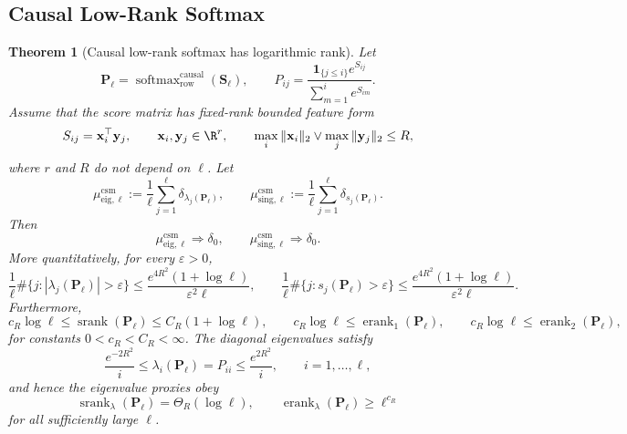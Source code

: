 \documentclass{article}
\newcommand{\srank}{\operatorname{srank}}
\newcommand{\erank}{\operatorname{erank}}
\newcommand{\weak}{\Rightarrow}
\newcommand{\one}{\mathbf{1}}
\newcommand{\bP}{\mathbf{P}}
\newcommand{\bS}{\mathbf{S}}
\newtheorem{theorem}{Theorem}
\theoremstyle{definition}
\theoremstyle{remark}
\begin{document}
\subsection{Causal Low-Rank Softmax}

\begin{theorem}[Causal low-rank softmax has logarithmic rank]
\label{thm:low-rank-causal-softmax-collapse}
Let
\[
    \bP_\ell
    =
    \operatorname{softmax}_{\mathrm{row}}^{\mathrm{causal}}(\bS_\ell),
    \qquad
    P_{ij}
    =
    \frac{\one_{\{j\leq i\}}e^{S_{ij}}}{\sum_{m=1}^{i}e^{S_{im}}}.
\]
Assume that the score matrix has fixed-rank bounded feature form
\begin{equation}
    S_{ij}=\mathbf x_i^\top\mathbf y_j,\qquad
    \mathbf x_i,\mathbf y_j\in\R^r,\qquad
    \max_i\|\mathbf x_i\|_2\vee\max_j\|\mathbf y_j\|_2\leq R,
    \label{eq:bounded-low-rank-causal-softmax-scores}
\end{equation}
where $r$ and $R$ do not depend on $\ell$.  Let
\[
    \mu_{\mathrm{eig},\ell}^{\mathrm{csm}}
    :=
    \frac1\ell\sum_{j=1}^{\ell}\delta_{\lambda_j(\bP_\ell)},
    \qquad
    \mu_{\mathrm{sing},\ell}^{\mathrm{csm}}
    :=
    \frac1\ell\sum_{j=1}^{\ell}\delta_{s_j(\bP_\ell)}.
\]
Then
\[
    \mu_{\mathrm{eig},\ell}^{\mathrm{csm}}\weak\delta_0,
    \qquad
    \mu_{\mathrm{sing},\ell}^{\mathrm{csm}}\weak\delta_0.
\]
More quantitatively, for every $\varepsilon>0$,
\[
    \frac1\ell\#\{j:|\lambda_j(\bP_\ell)|>\varepsilon\}
    \leq
    \frac{e^{4R^2}(1+\log\ell)}{\varepsilon^2\ell},
    \qquad
    \frac1\ell\#\{j:s_j(\bP_\ell)>\varepsilon\}
    \leq
    \frac{e^{4R^2}(1+\log\ell)}{\varepsilon^2\ell}.
    \label{eq:causal-softmax-lsd-collapse-count}
\]
Furthermore,
\[
    c_R\log\ell
    \leq
    \srank(\bP_\ell)
    \leq
    C_R(1+\log\ell),
    \qquad
    c_R\log\ell
    \leq
    \erank_1(\bP_\ell),
    \qquad
    c_R\log\ell
    \leq
    \erank_2(\bP_\ell),
    \label{eq:causal-softmax-singular-ranks-log}
\]
for constants $0<c_R<C_R<\infty$.  The diagonal eigenvalues satisfy
\[
    \frac{e^{-2R^2}}{i}
    \leq
    \lambda_i(\bP_\ell)=P_{ii}
    \leq
    \frac{e^{2R^2}}{i},
    \qquad i=1,\ldots,\ell,
\]
and hence the eigenvalue proxies obey
\[
    \srank_\lambda(\bP_\ell)
    =
    \Theta_R(\log\ell),
    \qquad
    \erank_\lambda(\bP_\ell)
    \geq
    \ell^{c_R}
    \label{eq:causal-softmax-eigenvalue-ranks}
\]
for all sufficiently large $\ell$.
\end{theorem}
\end{document}
